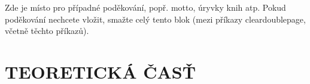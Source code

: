 \documentclass{template-definitions/thesistbuinzlin}
\begin{document}
\maketitle



\insertabstractandkeywords


\clearpage
Zde je místo pro případné poděkování, popř. motto, úryvky knih atp.
Pokud poděkování nechcete vložit, smažte celý tento blok 
(mezi příkazy cleardoublepage, včetně těchto příkazů).




\insertcontents  %








\paragraphindentationstart  %




\part{TEORETICKÁ ČASŤ}






\end{document}
